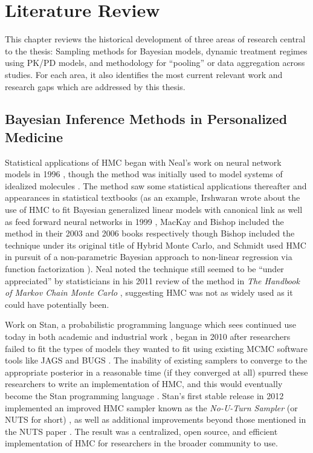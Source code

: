 \chapter{Literature Review}

This chapter reviews the historical development of three areas of research central to the thesis: Sampling methods for Bayesian models, dynamic treatment regimes using PK/PD models, and methodology for “pooling” or data aggregation across studies. For each area, it also identifies the most current relevant work and research gaps which are addressed by this thesis.



\section{Bayesian Inference Methods in Personalized Medicine}

Statistical applications of HMC began with Neal's work on neural network models in 1996 \cite{Neal1996-vn, brooks2011handbook}, though the method was initially used to model systems of idealized molecules \cite{duane1987hybrid}. The method saw some statistical applications thereafter and appearances in statistical textbooks (as an example, Irshwaran wrote about the use of HMC to fit Bayesian generalized linear models with canonical link as well as feed forward neural networks in 1999 \cite{ishwaran1999applications}, MacKay \cite[Chapter~30]{mackay2003information} and Bishop \cite[Chapter~11]{Bishop2006pattern} included the method in their 2003 and 2006 books respectively though Bishop included the technique under its original title of Hybrid Monte Carlo, and Schmidt used HMC in pursuit of a non-parametric Bayesian approach to non-linear regression via function factorization \cite{schmidt2009function}). Neal noted the technique still seemed to be ``under appreciated'' by statisticians in his 2011 review of the method in \textit{The Handbook of Markov Chain Monte Carlo} \cite[Chapter~5]{brooks2011handbook}, suggesting HMC was not as widely used as it could have potentially been.

Work on Stan, a probabilistic programming language which sees continued use today in both academic and industrial work \cite{betancourt2014geometric}, began in 2010 \cite{stan2012} after researchers failed to fit the types of models they wanted to fit using existing MCMC software tools like JAGS \cite{plummer2003jags} and BUGS \cite{lunn2000winbugs}.  The inability of existing samplers to converge to the appropriate posterior in a reasonable time (if they converged at all) spurred these researchers to write an implementation of HMC, and this would eventually become the Stan programming language \cite{stan2012}.  Stan's first stable release in 2012 \cite{stan2012} implemented an improved HMC sampler known as the \textit{No-U-Turn Sampler} (or NUTS for short) \cite{stan2012, hoffman2014no}, as well as additional improvements beyond those mentioned in the NUTS paper \cite{stan2012}.  The result was a centralized, open source, and efficient implementation of HMC for researchers in the broader community to use.

